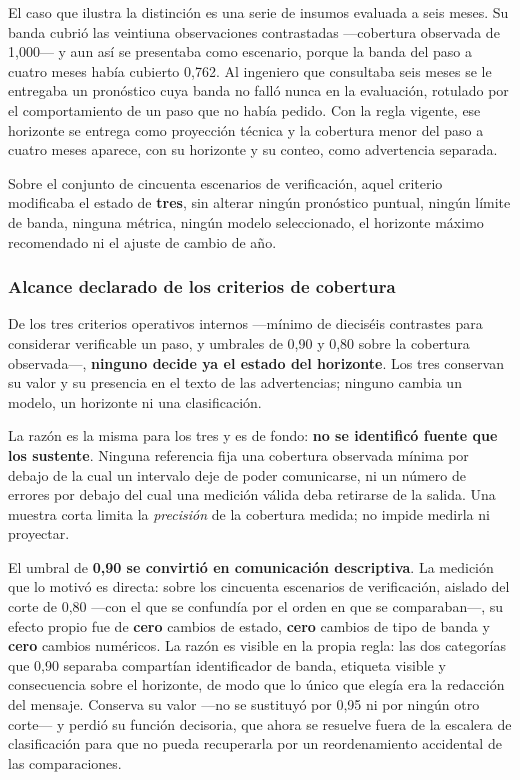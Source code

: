 \documentclass[12pt,letterpaper]{article}
\begin{document}
El caso que ilustra la distinción es una serie de insumos evaluada a seis meses. Su banda cubrió las veintiuna observaciones contrastadas ---cobertura observada de 1,000--- y aun así se presentaba como escenario, porque la banda del paso a cuatro meses había cubierto 0,762. Al ingeniero que consultaba seis meses se le entregaba un pronóstico cuya banda no falló nunca en la evaluación, rotulado por el comportamiento de un paso que no había pedido. Con la regla vigente, ese horizonte se entrega como proyección técnica y la cobertura menor del paso a cuatro meses aparece, con su horizonte y su conteo, como advertencia separada.

Sobre el conjunto de cincuenta escenarios de verificación, aquel criterio modificaba el estado de \textbf{tres}, sin alterar ningún pronóstico puntual, ningún límite de banda, ninguna métrica, ningún modelo seleccionado, el horizonte máximo recomendado ni el ajuste de cambio de año.

\subsubsection*{Alcance declarado de los criterios de cobertura}

De los tres criterios operativos internos ---mínimo de dieciséis contrastes para considerar verificable un paso, y umbrales de 0,90 y 0,80 sobre la cobertura observada---, \textbf{ninguno decide ya el estado del horizonte}. Los tres conservan su valor y su presencia en el texto de las advertencias; ninguno cambia un modelo, un horizonte ni una clasificación.

La razón es la misma para los tres y es de fondo: \textbf{no se identificó fuente que los sustente}. Ninguna referencia fija una cobertura observada mínima por debajo de la cual un intervalo deje de poder comunicarse, ni un número de errores por debajo del cual una medición válida deba retirarse de la salida. Una muestra corta limita la \emph{precisión} de la cobertura medida; no impide medirla ni proyectar.

El umbral de \textbf{0,90 se convirtió en comunicación descriptiva}. La medición que lo motivó es directa: sobre los cincuenta escenarios de verificación, aislado del corte de 0,80 ---con el que se confundía por el orden en que se comparaban---, su efecto propio fue de \textbf{cero} cambios de estado, \textbf{cero} cambios de tipo de banda y \textbf{cero} cambios numéricos. La razón es visible en la propia regla: las dos categorías que 0,90 separaba compartían identificador de banda, etiqueta visible y consecuencia sobre el horizonte, de modo que lo único que elegía era la redacción del mensaje. Conserva su valor ---no se sustituyó por 0,95 ni por ningún otro corte--- y perdió su función decisoria, que ahora se resuelve fuera de la escalera de clasificación para que no pueda recuperarla por un reordenamiento accidental de las comparaciones.
\end{document}

